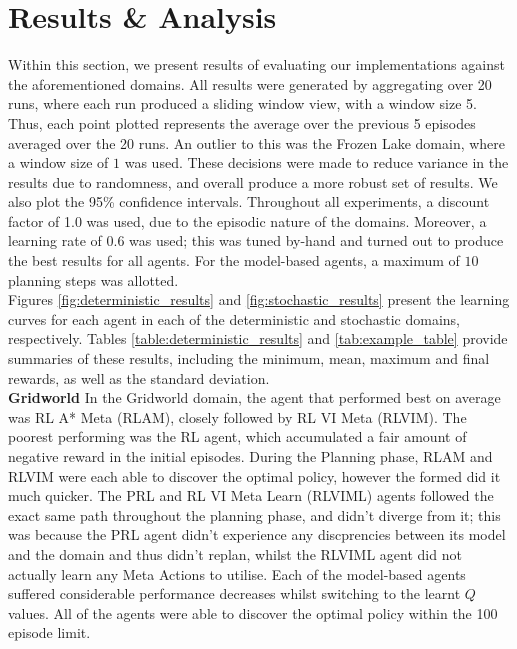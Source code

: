 \section{Results \& Analysis}
Within this section, we present results of evaluating our implementations against the aforementioned domains. All results were generated by aggregating over 20 runs, where each run produced a sliding window view, with a window size 5. Thus, each point plotted represents the average over the previous 5 episodes averaged over the 20 runs. An outlier to this was the Frozen Lake domain, where a window size of $1$ was used. These decisions were made to reduce variance in the results due to randomness, and overall produce a more robust set of results. We also plot the 95\% confidence intervals. Throughout all experiments, a discount factor of 1.0 was used, due to the episodic nature of the domains. Moreover, a learning rate of $0.6$ was used; this was tuned by-hand and turned out to produce the best results for all agents. For the model-based agents, a maximum of $10$ planning steps was allotted.
\\Figures \ref{fig:deterministic_results} and \ref{fig:stochastic_results} present the learning curves for each agent in each of the deterministic and stochastic domains, respectively. Tables \ref{table:deterministic_results} and \ref{tab:example_table} provide summaries of these results, including the minimum, mean, maximum and final rewards, as well as the standard deviation.
\\\textbf{Gridworld} \quad In the Gridworld domain, the agent that performed best on average was RL A* Meta (RLAM), closely followed by RL VI Meta (RLVIM). The poorest performing was the RL agent, which accumulated a fair amount of negative reward in the initial episodes. During the Planning phase, RLAM and RLVIM were each able to discover the optimal policy, however the formed did it much quicker. The PRL and RL VI Meta Learn (RLVIML) agents followed the exact same path throughout the planning phase, and didn't diverge from it; this was because the PRL agent didn't experience any discprencies between its model and the domain and thus didn't replan, whilst the RLVIML agent did not actually learn any Meta Actions to utilise. Each of the model-based agents suffered considerable performance decreases whilst switching to the learnt $Q$ values. All of the agents were able to discover the optimal policy within the 100 episode limit.
